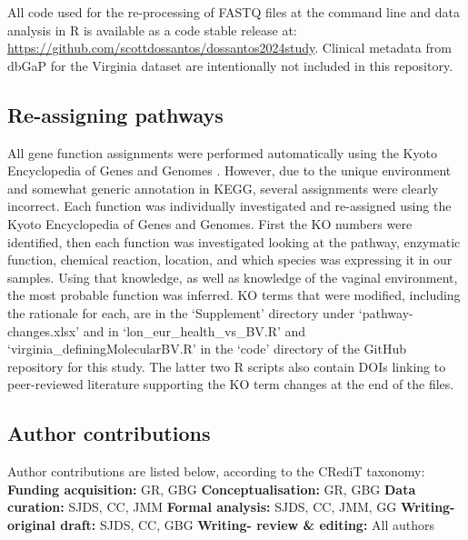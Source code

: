 \documentclass[sn-mathphys,Numbered]{sn-jnl}%
\begin{document}
All code used for the re-processing of FASTQ files at the command line and data analysis in R is available as a code stable release at: \url{https://github.com/scottdossantos/dossantos2024study}. Clinical metadata from dbGaP for the Virginia dataset are intentionally not included in this repository.

\subsection{Re-assigning pathways}\label{subsec:subsecPathways}
All gene function assignments were performed automatically using the Kyoto Encyclopedia of Genes and Genomes \cite{Kanehisa:2010}. However, due to the unique environment and somewhat generic annotation in KEGG, several assignments were clearly incorrect. Each function was individually investigated and re-assigned using the Kyoto Encyclopedia of Genes and Genomes. First the KO numbers were identified, then each function was investigated looking at the pathway, enzymatic function, chemical reaction, location, and which species was expressing it in our samples. Using that knowledge, as well as knowledge of the vaginal environment, the most probable function was inferred. KO terms that were modified, including the rationale for each, are in the `Supplement' directory under `pathway-changes.xlsx' and in `lon\_eur\_health\_vs\_BV.R' and `virginia\_definingMolecularBV.R' in the `code' directory of the GitHub repository for this study. The latter two R scripts also contain DOIs linking to peer-reviewed literature supporting the KO term changes at the end of the files.

\subsection{Author contributions}\label{subsec:subsecContribs}
Author contributions are listed below, according to the CRediT taxonomy:
\\
\newline
\textbf{Funding acquisition:} GR, GBG\newline
\textbf{Conceptualisation:} GR, GBG\newline
\textbf{Data curation:} SJDS, CC, JMM\newline
\textbf{Formal analysis:} SJDS, CC, JMM, GG\newline
\textbf{Writing- original draft:} SJDS, CC, GBG\newline
\textbf{Writing- review \& editing:} All authors
\newpage
\end{document}
